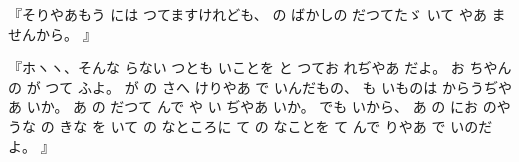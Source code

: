 『そりやあもう
には
つてますけれども、
の
ばかしの
だつてたゞ
いて
やあ
ませんから。
』

『ホヽヽ、そんな
らない
つとも
いことを
と
つてお
れぢやあ
だよ。
お
ちやんの
が
つて
ふよ。
が
の
さへ
けりやあ
で
いんだもの、
も
いものは
からうぢやあ
いか。
あ
の
だつて
んで
や
い
ぢやあ
いか。
でも
いから、
あ
の
にお
のやうな
の
きな
を
いて
の
なところに
て
の
なことを
て
んで
りやあ
で
いのだよ。
』

